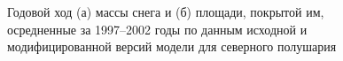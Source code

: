 \documentclass[a4paper, fontsize=14pt]{scrartcl}
\begin{document}
\newpage
\begin{figure}[H]
    \begin{minipage}[h]{0.8\linewidth}
    \end{minipage}
    \begin{minipage}[h]{0.8\linewidth}
    \end{minipage}\sloppy
    \caption{Годовой ход (а) массы снега и (б) площади, покрытой им, осредненные за 1997--2002 годы по данным исходной и модифицированной версий модели для северного полушария}
    \label{fig:imageSn}
\end{figure}
\end{document}
